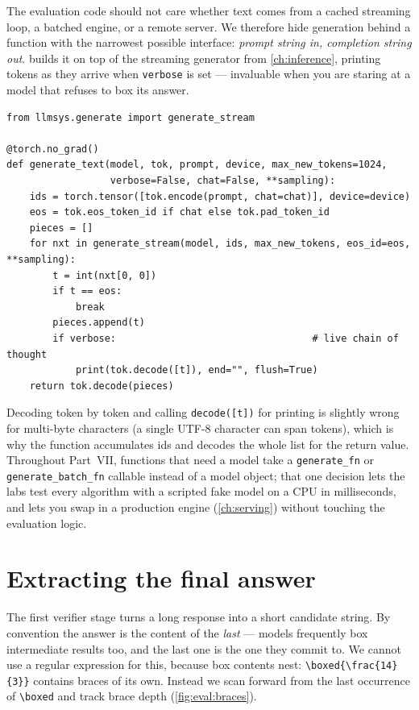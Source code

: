 The evaluation code should not care whether text comes from a cached streaming loop, a batched
engine, or a remote server. We therefore hide generation behind a function with the narrowest
possible interface: \emph{prompt string in, completion string out}.  builds
it on top of the streaming generator from \cref{ch:inference}, printing tokens as they arrive when
\texttt{verbose} is set --- invaluable when you are staring at a model that refuses to box its
answer.

\begin{lstlisting}[caption={Prompt-in, text-out wrapper over the cached streaming generator.},label={lst:eval:wrapper}]
from llmsys.generate import generate_stream

@torch.no_grad()
def generate_text(model, tok, prompt, device, max_new_tokens=1024,
                  verbose=False, chat=False, **sampling):
    ids = torch.tensor([tok.encode(prompt, chat=chat)], device=device)
    eos = tok.eos_token_id if chat else tok.pad_token_id
    pieces = []
    for nxt in generate_stream(model, ids, max_new_tokens, eos_id=eos, **sampling):
        t = int(nxt[0, 0])
        if t == eos:
            break
        pieces.append(t)
        if verbose:                                  # live chain of thought
            print(tok.decode([t]), end="", flush=True)
    return tok.decode(pieces)
\end{lstlisting}

Decoding token by token and calling \texttt{decode([t])} for printing is slightly wrong for
multi-byte characters (a single UTF-8 character can span tokens), which is why the function
accumulates ids and decodes the whole list for the return value. Throughout Part~VII, functions
that need a model take a \texttt{generate\_fn} or \texttt{generate\_batch\_fn} callable instead
of a model object; that one decision lets the labs test every algorithm with a scripted fake
model on a CPU in milliseconds, and lets you swap in a production engine (\cref{ch:serving})
without touching the evaluation logic.

\section{Extracting the final answer}\label{sec:eval:extract}


The first verifier stage turns a long response into a short candidate string. By convention the
answer is the content of the \emph{last} \bx{} --- models frequently box intermediate results
too, and the last one is the one they commit to. We cannot use a regular expression for this,
because box contents nest: \texttt{\textbackslash boxed\{\textbackslash frac\{14\}\{3\}\}}
contains braces of its own. Instead we scan forward from the last occurrence of
\texttt{\textbackslash boxed} and track brace depth (\cref{fig:eval:braces}).

